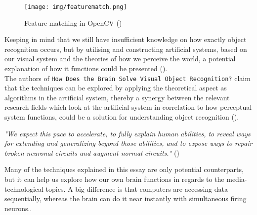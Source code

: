 \documentclass{article}
\newcommand{\goodcite}[1]{ {(\cite{#1})}}
\begin{document}
\begin{figure}[H]
    \centering
    \texttt{[image: img/featurematch.png]}
    \caption{Feature matching in OpenCV\goodcite{OpenCV}}
    \label{fig:feature_matching}
\end{figure}


Keeping in mind that we still have insufficient knowledge on how exactly object recognition occurs, but by utilising and constructing artificial systems, based on our visual system and the theories of how we perceive the world, a potential explanation of how it functions could be presented\goodcite{solveVisual}.\\
The authors of \texttt{How Does the Brain Solve Visual Object Recognition?} claim that the techniques can be explored by applying the theoretical aspect as algorithms in the artificial system, thereby a synergy between the relevant research fields which look at the artificial system in correlation to how perceptual system functions, could be a solution for understanding object recognition\goodcite{solveVisual}.\\
\begin{center}
    \textit{"We expect this pace to accelerate, to fully explain human abilities, to reveal ways for extending and generalizing beyond those abilities, and to expose ways to repair broken neuronal circuits and augment normal circuits."}\goodcite{solveVisual}\medskip \\
\end{center}
Many of the techniques explained in this essay are only potential counterparts, but it can help us explore how our own brain functions in regards to the media-technological topics. A big difference is that computers are accessing data sequentially, whereas the brain can do it near instantly with simultaneous firing neurons..
\end{document}
